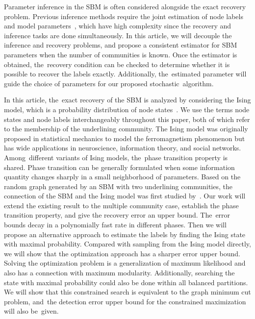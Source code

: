 \documentclass[entropy,article,accept,moreauthors,pdftex]{Definitions/mdpi}
\newcommand{\1}{\mathbbm{1}}
\begin{document}
Parameter inference in the  SBM is often considered alongside the exact recovery problem.
Previous inference methods require the joint estimation of node labels and model parameters~\cite{nowicki2001estimation}, which have high complexity since the recovery and inference tasks are done simultaneously.
In this article, we will decouple the inference and recovery problems, and propose a consistent estimator for SBM parameters when the number of communities is known. Once  the estimator is obtained, the~recovery condition can be checked to determine whether it is possible to recover the labels
exactly. Additionally, the~estimated parameter will guide the choice of parameters for our proposed stochastic~algorithm.

In this article, the~exact recovery of the SBM is analyzed by considering
the Ising model, which is a probability distribution of node states~\cite{ising1925beitrag}. We use the terms node states and node labels interchangeably throughout this paper, both of which refer to the membership of the underlining community. The
Ising model was originally proposed in statistical mechanics to model the ferromagnetism phenomenon but has wide applications in neuroscience, information theory,
and social networks. Among~different variants of Ising models, the~phase transition property is shared. Phase transition can be generally formulated when
some information quantity changes sharply in a small neighborhood of parameters.
Based on the random graph generated by an SBM with two underlining communities,
the connection of the SBM and the Ising model was first studied by~\cite{ye2020exact}. Our work will extend the existing result to the multiple community case, establish the phase transition
property, and give the recovery error an upper bound. The~error bounds decay in a polynomially fast rate in different phases.
Then we will propose an alternative approach to estimate the labels by finding the Ising state with maximal probability.
Compared with sampling from the Ising model directly,
we will show that the optimization approach has a sharper error upper bound. Solving the optimization problem
is a generalization of maximum likelihood and also has a connection with maximum modularity.
Additionally, searching the state with maximal probability
could also be done within all balanced partitions. We will show that this constrained search is equivalent to the  graph minimum cut problem, and~the detection
error upper bound for the constrained maximization will also be~given.
\end{document}
